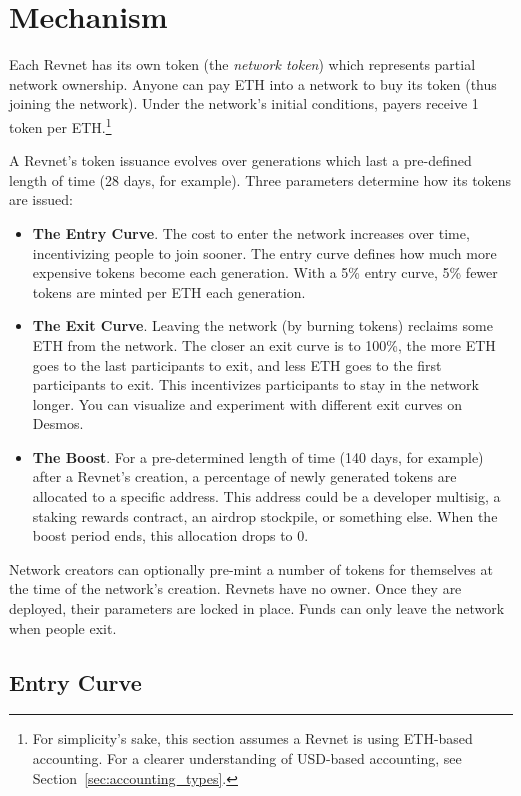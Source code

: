 \documentclass{article}
\begin{document}
\section{Mechanism}

Each Revnet has its own token (the \textit{network token}) which represents partial network ownership. Anyone can pay ETH into a network to buy its token (thus joining the network). Under the network's initial conditions, payers receive 1 token per ETH.\footnote{For simplicity's sake, this section assumes a Revnet is using ETH-based accounting. For a clearer understanding of USD-based accounting, see Section~\ref{sec:accounting_types}.}

A Revnet's token issuance evolves over generations which last a pre-defined length of time (28 days, for example). Three parameters determine how its tokens are issued:

\begin{itemize}
  \item \textbf{The Entry Curve}. The cost to enter the network increases over time, incentivizing people to join sooner. The entry curve defines how much more expensive tokens become each generation. With a 5\% entry curve, 5\% fewer tokens are minted per ETH each generation.
  \item \textbf{The Exit Curve}. Leaving the network (by burning tokens) reclaims some ETH from the network. The closer an exit curve is to 100\%, the more ETH goes to the last participants to exit, and less ETH goes to the first participants to exit. This incentivizes participants to stay in the network longer. You can visualize and experiment with different exit curves on Desmos.
  \item \textbf{The Boost}. For a pre-determined length of time (140 days, for example) after a Revnet's creation, a percentage of newly generated tokens are allocated to a specific address. This address could be a developer multisig, a staking rewards contract, an airdrop stockpile, or something else. When the boost period ends, this allocation drops to 0.
\end{itemize}

Network creators can optionally pre-mint a number of tokens for themselves at the time of the network's creation. Revnets have no owner. Once they are deployed, their parameters are locked in place. Funds can only leave the network when people exit.

\subsection{Entry Curve}
\end{document}
